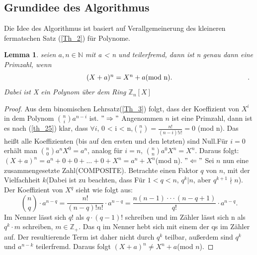 \documentclass[12pt,oneside]{article}
\newtheorem{lemma}[theorem]{Lemma}
\theoremstyle{remark}
\theoremstyle{definition}
\begin{document}
\subsection{Grundidee des Algorithmus}
Die Idee des Algorithmus ist basiert auf  Verallgemeinerung des kleineren fermatschen Satz (\ref{Th_2}) für Polynome.
\begin{flushleft}
\begin{lemma}\label{hauptlemma}
seien $a,n \in \mathbb{N}$ mit a < n und teilerfremd, dann ist n genau dann eine Primzahl, wenn \newline
\begin{equation}\label{eq:1}
\centerline{ $(X + a)^n = X^n +a $(mod n).}.
\end{equation}\newline
Dabei ist X ein Polynom über dem Ring $\mathbb{Z}_{n}[X]$
\end{lemma}
\begin{proof}
Aus dem binomischen Lehrsatz(\ref{Th_3}) folgt, dass der Koeffizient von $X^i$ in dem Polynom ${n \choose i} a^{n-i}$ ist.\newline\newline
$"\Rightarrow"$\newline
Angenommen $n$ ist eine Primzahl, dann ist es nach (\ref{th_25}) klar, dass $\forall i $, 0 < i < n,\newline\smallskip ${n \choose i} = \frac{n!}{(n-i)! i!} = 0 $ (mod n). Das heißt alle Koeffizienten (bis auf den ersten und den letzten) sind Null.\newline\smallskip Für $i = 0$ erhält man  ${n \choose 0} a^n X^0 = a^n$, analog für $i = n$, ${n \choose n} a^0 X^n = X^n$. Daraus folgt:
$(X + a)^n = a^n + 0 + 0 + ... + 0 + X^n = a^n + X^n$(mod n).\newline\newline
$"\Leftarrow"$\newline
Sei $n$ nun eine zusammengesetzte Zahl(COMPOSITE). Betrachte einen Faktor $q$ von $n$, mit der Vielfachheit $k$(Dabei ist zu beachten, dass Für $1 < q < n$, $q^k | n$, aber $q^{k+1} \nmid n$).\newline
Der Koeffizient von $X^q$ sieht wie folgt aus:\newline\smallskip
\begin{equation}
    {n \choose q} \cdot a^{n-q} = \frac{n!}{(n-q)! n!} \cdot a^{n-q} = \frac{n(n-1)\cdot \cdot \cdot (n-q+1)}{q!} \cdot a^{n-q}.
\end{equation}
\newline\newline
Im Nenner lässt sich $q!$ als $q \cdot (q-1)!$ schreiben und im Zähler lässt sich n als $q^k\cdot m$ schreiben, $m \in \mathbb{Z}_{+}$. Das q im Nenner hebt sich mit einem der qs im Zähler auf. Der resultierende Term ist daher nicht durch $q^k$ teilbar, außerdem sind $q^k$ und $a^{n-k}$ teilerfremd. Daraus folgt $(X + a)^n \neq X^n + a $(mod $n$).
\end{proof}


\end{flushleft}
\end{document}
